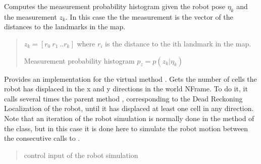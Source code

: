\documentclass[letterpaper,10pt,english]{sphinxmanual}
\begin{document}
\begin{fulllineitems}
\begin{fulllineitems}
\label{\detokenize{GridLocalization:GL_3DOFDifferentialDrive.GL_3DOFDifferentialDrive.MeasurementProbability}}
\pysigstartsignatures
{}
\pysigstopsignatures
\sphinxAtStartPar
Computes the measurement probability histogram given the robot pose \(\eta_k\) and the measurement \(z_k\).
In this case the the measurement is the vector of the distances to the landmarks in the map.
\begin{quote}\begin{description}
\sphinxAtStartPar
{} \textendash{} \(z_k=[r_0~r_1~..r_k]\) where \(r_i\) is the distance to the i\sphinxhyphen{}th landmark in the map.

\sphinxAtStartPar
Measurement probability histogram \(p_z=p(z_k | \eta_k)\)

\end{description}\end{quote}

\end{fulllineitems}


\begin{fulllineitems}
\label{\detokenize{GridLocalization:GL_3DOFDifferentialDrive.GL_3DOFDifferentialDrive.GetInput}}
\pysigstartsignatures
{}
\pysigstopsignatures
\sphinxAtStartPar
Provides an implementation for the virtual method .
Gets the number of cells the robot has displaced in the x and y directions in the world N\sphinxhyphen{}Frame. To do it, it
calls several times the parent method , corresponding to the Dead Reckoning Localization
of the robot, until it has displaced at least one cell in any direction.
Note that an iteration of the robot simulation  is normally done in the 
method of the  class, but in this case it is done here to simulate the robot motion
between the consecutive calls to .
\begin{quote}\begin{description}
\sphinxAtStartPar
{} \textendash{} control input of the robot simulation


\end{description}
\end{quote}
\end{fulllineitems}
\end{fulllineitems}
\end{document}
